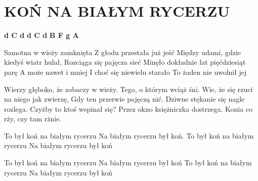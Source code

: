 \documentclass[../../../songbook.tex]{subfiles}
\begin{document}
\TabPositions{8cm} %
\section*{KOŃ NA BIAŁYM RYCERZU}
{}
\vspace{0.5cm}
{\color{red}\textbf{d C d } } \newline
{\color{red}\textbf{d C d } } \newline
{\color{red}\textbf{B F g A } } \newline

Samotna w wieży zamknięta	 \newline
Z głodu przestała już jeść	 \newline
Między udami, gdzie kiedyś wiatr hulał,	 \newline
Rozciąga się pajęcza sieć	 \newline
Minęło dokładnie lat pięćdziesiąt parę	 \newline
A może nawet i mniej	 \newline
I choć się niewielu starało	 \newline
To żaden nie uwolnił jej	 \newline

Wierzy głęboko, że zobaczy w wieży. \newline
Tego, o którym wciąż śni. \newline
Wie, że się rzuci na niego jak zwierzę, \newline
Gdy ten przerwie pajęczą nić. \newline
Dziwne stękanie się nagle rozlega. \newline
Czyżby to ktoś wspinał się? \newline
Przez okno księżniczka dostrzega. \newline
Konia co rży, czy tam rżnie. \newline

\-\hspace{1cm} To był koń na białym rycerzu	 \newline
\-\hspace{1cm} Na białym rycerzu był koń.	 \newline
\-\hspace{1cm} To był koń na białym rycerzu	 \newline
\-\hspace{1cm} Na białym rycerzu był koń	 \newline

\-\hspace{1cm} To był koń na białym rycerzu \newline
\-\hspace{1cm} Na białym rycerzu był koń \newline
\-\hspace{1cm} To był koń na białym rycerzu \newline
\-\hspace{1cm} Na białym rycerzu był koń	 \newline
\end{document}
